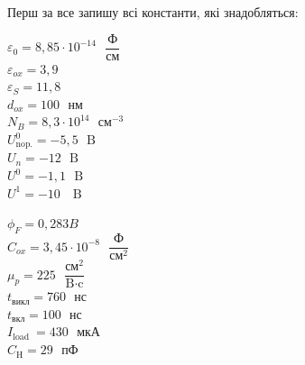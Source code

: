 \documentclass[a4paper,14pt]{extreport}
\begin{document}
Перш за все запишу всі константи, які знадобляться:\\
\vspace{0.2cm}
\begin{minipage}{0.5\textwidth}
    \begin{flushleft}
  	\vspace{0.2cm}
  $\varepsilon_{0}=8,85 \cdot 10^{-14} \text{ }\dfrac{\text{Ф}}{\text{см}}$\\
  \vspace{0.2cm}
  $\varepsilon_{ox}=3,9$\\
  \vspace{0.2cm}
  $\varepsilon_{S}=11,8$\\
  \vspace{0.2cm}
  $ d_{o x}=100 \text{ } \text{нм}$\\
  \vspace{0.2cm}
  $ N_{B}=8,3 \cdot 10^{14}\text{ } \text{см}^{-3}$\\
  \vspace{0.2cm}
  $ U_{\text{nop.}}^{0}=-5,5 \text{ }\text{B}$\\
  \vspace{0.2cm}
  $ U_{n}=-12 \text{ }\text{B}$\\
  \vspace{0.2cm}
  $U^{0}=-1,1 \text{ }\text{B}$\\
  \vspace{0.2cm}
  $U^{1}=-10 \text{ }\text{~B}$\\
    \end{flushleft}
  \end{minipage}
  \begin{minipage}{0.3\textwidth}
    \begin{flushright}
    $\phi_{F}=0,283 B$\\
    \vspace{0.2cm}
    $C_{ox}=3,45 \cdot 10^{-8} \text{ }\dfrac{\text{Ф}}{\text{см}^{2}}$\\
    \vspace{0.2cm}
    $\mu_{p} = 225 \text{ }\dfrac{\text{см}^{2}}{\text{B}\cdot\text{c}}$\\
    \vspace{0.2cm}
    $t_{\text{викл}} = 760 \text{ }\text{нс}$\\
    \vspace{0.2cm}
    $ t_{\text{вкл}}= 100 \text{ }\text{нс}$\\
    \vspace{0.2cm} 
    $ I_{\text {load }}= 430\text{ } \text{мкА}$\\
    \vspace{0.2cm}
    $ C_{\text {H}}= 29\text{ } \text{пФ}$\\
    \vspace{0.2cm}
    \end{flushright}
\end{minipage}
\end{document}
